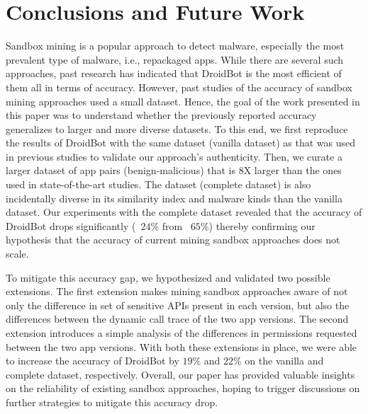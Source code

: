 \section{Conclusions and Future Work}\label{sec:conclusions}


Sandbox mining is a popular approach to detect malware, especially the most prevalent type of malware, i.e., repackaged apps. While there are several such approaches, past research has indicated that DroidBot is the most efficient of them all in terms of accuracy. However, past studies of the accuracy of sandbox mining approaches used a small dataset. 
Hence, the goal of the work presented in this paper was to understand whether the previously reported accuracy generalizes to larger and more diverse datasets. To this end, we first reproduce the results of DroidBot with the same dataset (vanilla dataset) as that was used in previous studies to validate our approach's authenticity. Then, we curate a larger dataset of app pairs (benign-malicious) that is 8X larger than the ones used in state-of-the-art studies. The dataset (complete dataset) is also incidentally diverse in its similarity index and malware kinds than the vanilla dataset. Our experiments with the complete dataset revealed that the accuracy of DroidBot drops significantly (~$24\%$ from ~$65\%$) thereby confirming our hypothesis that the accuracy of current mining sandbox approaches does not scale.
      
To mitigate this accuracy gap, we hypothesized and validated two possible extensions. The first extension makes mining sandbox approaches aware of not only the difference in set of sensitive APIs present in each version, but also the differences between the dynamic call trace of the two app versions. The second extension introduces a simple analysis of the differences in permissions requested between the two app versions. With both these extensions in place, we were able to increase the accuracy of DroidBot by $19\%$ and $22\%$ on the vanilla and complete dataset, respectively. 
Overall, our paper has provided valuable insights on the reliability of existing sandbox approaches, hoping to trigger discussions on further strategies to mitigate this accuracy drop. 



